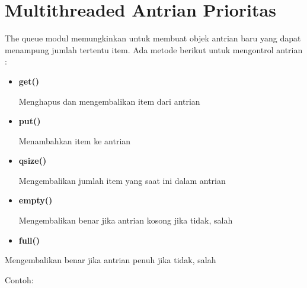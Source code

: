 \documentclass [12pt,a4paper,notitlepage,oneside,bahasa]{article}
\begin{document}
\section{Multithreaded Antrian Prioritas} \par
The queue modul memungkinkan untuk membuat objek antrian baru yang dapat menampung jumlah tertentu item. Ada metode berikut untuk mengontrol antrian : \par
\begin{itemize}
	\item \textbf{get()} \par
		Menghapus dan mengembalikan item dari antrian
	\par
	\item \textbf{put()} \par
		Menambahkan item ke antrian
	\par
	\item \textbf{qsize()} \par
		Mengembalikan jumlah item yang saat ini dalam antrian
	\par
	\item \textbf{empty()} \par
		Mengembalikan benar jika antrian kosong jika tidak, salah
	\par
	\item \textbf{full()}\end{itemize}
\par
	Mengembalikan benar jika antrian penuh jika tidak, salah
\par
\vspace{12pt}
\vspace{12pt}
\vspace{12pt}
\noindent 
Contoh: 
\end{document}
